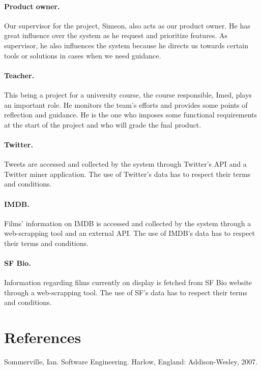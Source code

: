 \documentclass{article}
\begin{document}
\paragraph{Product owner.} Our supervisor for the project, Simeon, also acts as our product owner. He has great influence over the system as he request and prioritize features. 
As supervisor, he also influences the system because he directs us towards certain tools or solutions in cases when we need guidance.

\paragraph{Teacher.}
This being a project for a university course, the course responsible, Imed, plays an important role. He monitors the team's efforts and provides some points of reflection and guidance. He is the one who imposes some functional requirements at the start of the project and who will grade the fnal product.

\paragraph{Twitter.}
Tweets are accessed and collected by the system through Twitter's API and a Twitter miner application. The use of Twitter's data has to respect their terms and conditions.

\paragraph{IMDB.}
Films' information on IMDB is accessed and collected by the system through a web-scrapping tool and an external API. The use of IMDB's data has to respect their terms and conditions.

\paragraph{SF Bio.}
Information regarding films currently on display is fetched from SF Bio website through a web-scrapping tool. The use of SF's data has to respect their terms and conditions.




\section{References}
Sommerville, Ian. Software Engineering. Harlow, England: Addison-Wesley, 2007.
\end{document}
